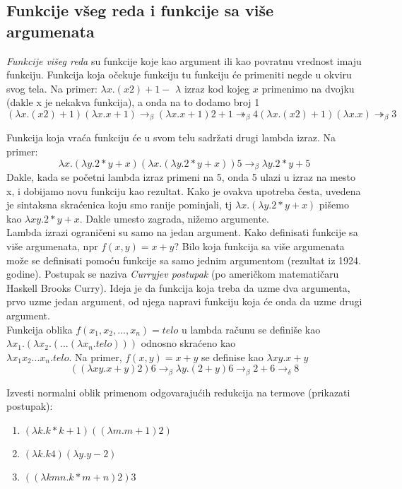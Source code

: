 \documentclass[../main.tex]{subfiles}
\begin{document}
\subsection{Funkcije všeg reda i funkcije sa više argumenata}		%

{\it Funkcije višeg reda} su funkcije koje kao argument ili kao povratnu vrednost imaju funkciju. Funkcija koja očekuje funkciju tu funkciju će primeniti negde u okviru svog tela. Na primer:
$\lambda x.(x 2) +1 -$ $\lambda$ izraz kod kojeg $x$ primenimo na dvojku (dakle x je nekakva funkcija), a onda na to dodamo broj 1
$$ (\lambda x.(x 2) + 1)(\lambda x.x + 1) \rightarrow_\beta (\lambda x.x + 1)2 + 1 \twoheadrightarrow_\beta 4(\lambda x.(x 2) +1)(\lambda x.x) \twoheadrightarrow_\beta 3$$

Funkcija koja vraća funkciju će u svom telu sadržati drugi lambda izraz. Na primer:
$$ \lambda x.(\lambda y.2 * y + x) (\lambda x.(\lambda y.2 * y + x))5 \rightarrow_\beta \lambda y.2 * y + 5 $$
Dakle, kada se početni lambda izraz primeni na 5, onda 5 ulazi u izraz na mesto x, i dobijamo novu funkciju kao rezultat. Kako je ovakva upotreba česta, uvedena je sintaksna skraćenica koju smo ranije pominjali, tj $\lambda x.(\lambda y.2 * y + x)$ pišemo kao $\lambda xy.2 * y + x$. Dakle umesto zagrada, nižemo argumente. 
\\
Lambda izrazi ograničeni su samo na jedan argument. Kako definisati funkcije sa više argumenata, npr $f(x,y) = x + y$? Bilo koja funkcija sa više argumenata može se definisati pomoću funkcije sa samo jednim argumentom (rezultat iz 1924. godine). Postupak se naziva {\it Curryjev postupak} (po američkom matematičaru Haskell Brooks Curry). Ideja je da funkcija koja treba da uzme dva argumenta, prvo uzme jedan argument, od njega napravi funkciju koja će onda da uzme drugi argument.
\\
Funkcija oblika $f(x_1,x_2,...,x_n) = telo$ u lambda računu se definiše kao $\lambda x_1.(\lambda x_2.(...(\lambda x_n.telo)))$ odnosno skraćeno kao \\ %
$\lambda x_1x_2...x_n.telo$. Na primer, $f(x,y) = x + y$ se definise kao $\lambda xy.x + y$
$$ ((\lambda xy.x + y)2)6 \rightarrow_\beta \lambda y.(2 + y)6 \rightarrow_\beta 2+6 \rightarrow_\delta 8$$
\begin{boxprimer}
Izvesti normalni oblik primenom odgovarajućih redukcija na termove (prikazati postupak):
\begin{enumerate}
\item $(\lambda k.k * k + 1)((\lambda m.m + 1)2)$
\item $(\lambda k.k 4)(\lambda y.y - 2)$
\item $((\lambda kmn.k * m + n)2)3$
\end{enumerate}
\end{boxprimer}
\end{document}
